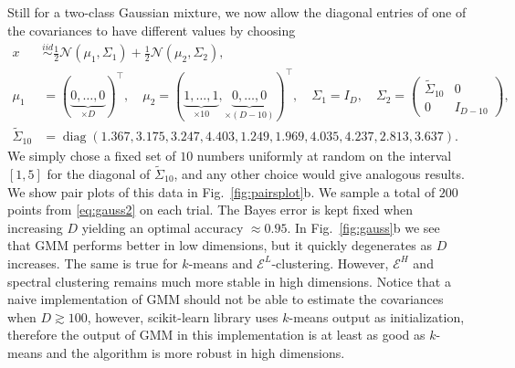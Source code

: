 \documentclass[aps,preprint,nofootinbib,floatfix]{revtex4-1}
\DeclareMathOperator{\diag}{diag}
\begin{document}
Still for a two-class Gaussian mixture, 
we now allow the diagonal entries of one of the covariances to
have different values by choosing
\begin{equation}
\label{eq:gauss2}
\begin{split}
x & \stackrel{iid}{\sim} 
\tfrac{1}{2}\mathcal{N}(\mu_1,\Sigma_1)+
\tfrac{1}{2}\mathcal{N}(\mu_2,\Sigma_2),  \\
\mu_1 &= (\underbrace{0,\dotsc,0}_{\times D})^\top , \quad
\mu_2 = (\underbrace{1,\dots,1}_{\times 10},
\underbrace{0,\dots,0}_{\times (D-10)})^\top, \quad
\Sigma_1 = I_D, \quad
\Sigma_2 = \left( \begin{array}{c|c}
\widetilde{\Sigma}_{10} & 0 \\ \hline 
0 & I_{D-10} \end{array}\right), \\
\widetilde{\Sigma}_{10} &= \diag(1.367,  3.175,  3.247,  4.403,  1.249,
1.969, 4.035,   4.237,  2.813,  3.637).
\end{split}
\end{equation}
We simply chose a fixed set of $10$ numbers uniformly at random on 
the interval $[1,5]$ for
the diagonal of $\widetilde{\Sigma}_{10}$, and any other choice would give 
analogous results. 
We show pair plots of this data in Fig.~\ref{fig:pairsplot}b.
We sample a total of $200$ points from \eqref{eq:gauss2}
on each trial.
The Bayes error is kept fixed when increasing $D$ yielding
an optimal accuracy $\approx 0.95$.
In Fig.~\ref{fig:gauss}b we see that GMM performs better in low dimensions, 
but it quickly degenerates as $D$ increases. 
The same is true for $k$-means and $\mathcal{E}^L$-clustering.
However, $\mathcal{E}^H$ and spectral clustering remains much
more stable in high dimensions.
Notice that a naive implementation of GMM should not be able to 
estimate the covariances when $D \gtrsim 100$, however, scikit-learn library
uses $k$-means output as initialization, therefore the
output of GMM in this implementation is at least as good as $k$-means and
the algorithm is more robust in high dimensions.
\end{document}
